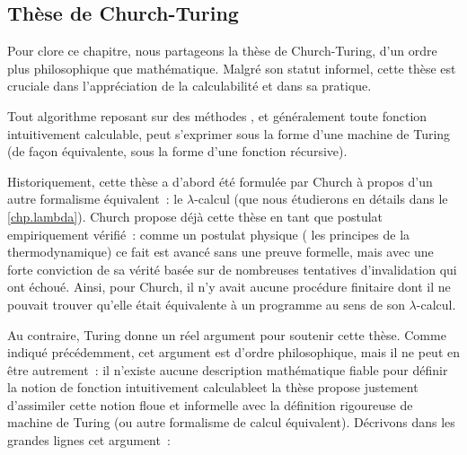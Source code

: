 \subsection{Thèse de Church-Turing}

Pour clore ce chapitre, nous partageons la thèse de Church-Turing, d'un ordre
plus philosophique que mathématique. Malgré son statut informel, cette thèse
est cruciale dans l'appréciation de la calculabilité et dans sa pratique.

\begin{thesis}\label{thesis.CT}
  Tout algorithme reposant sur des
  méthodes , et généralement toute fonction intuitivement
  calculable, peut s'exprimer sous la forme d'une machine de Turing (de façon
  équivalente, sous la forme d'une fonction récursive).
\end{thesis}

Historiquement, cette thèse a d'abord été formulée par Church à propos d'un
autre formalisme équivalent~: le $\lambda$-calcul (que nous étudierons en
détails dans le \cref{chp.lambda}). Church \cite{Church1936}
propose déjà cette thèse en tant que postulat empiriquement vérifié~: comme
un postulat physique ( les principes de la thermodynamique)
ce fait est avancé sans une preuve formelle, mais avec une forte conviction de
sa vérité basée sur de nombreuses tentatives d'invalidation qui ont échoué.
Ainsi, pour Church, il n'y avait aucune procédure finitaire dont il ne pouvait
trouver qu'elle était équivalente à un programme au sens de son
$\lambda$-calcul.

Au contraire, Turing \cite{Turing1936a} donne un réel argument pour soutenir
cette thèse. Comme indiqué précédemment, cet argument est d'ordre philosophique,
mais il ne peut en être autrement~: il n'existe aucune description mathématique
fiable pour définir la notion de \og fonction intuitivement calculable\fg et la
thèse propose justement d'assimiler cette notion floue et informelle avec la
définition rigoureuse de machine de Turing (ou autre formalisme de calcul
équivalent). Décrivons dans les grandes lignes cet argument~:

